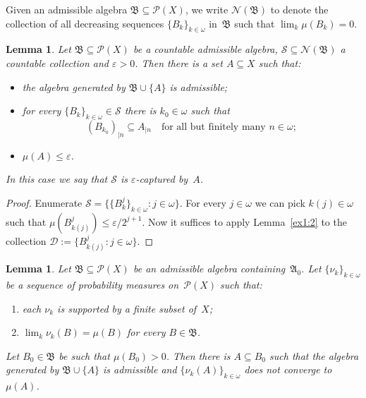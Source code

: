 \documentclass[12pt]{amsart}
\newcommand{\sub}{\subseteq}
\newcommand\eps{\ensuremath{\varepsilon}}
\newcommand{\alg}{\mathfrak A}
\newcommand{\algb}{\mathfrak B}
\newcommand{\NN}{{\mathcal N}}
\newcommand{\PP}{{\mathcal P}}
\newcommand{\0}{\protect{\bf 0}}
\newcommand{\1}{\protect{\bf 1}}
\newtheorem{lemma}[theo]{Lemma}
\theoremstyle{definition}
\theoremstyle{remark}
\numberwithin{equation}{section}
\begin{document}
Given an admissible algebra $\algb \sub \mathcal{P}(X)$, we write $\NN(\algb)$ to denote the collection
of all decreasing sequences $\{B_k\}_{k\in \omega}$ in~$\algb$ such
that $\lim_k\mu(B_k)= 0$. 

\begin{lemma}\label{ex1:4}
Let $\algb \sub \mathcal{P}(X)$ be a countable admissible algebra,  
$\mathcal{S} \sub \NN(\algb)$ a countable collection and $\eps>0$.
Then there is a set $A\sub X$ such that:
\begin{itemize}
\item[(i)] the algebra generated by $\algb\cup \{A\}$ is admissible;
\item[(ii)] for every $\{B_k\}_{k\in \omega}\in \mathcal{S}$ there is $k_0\in \omega$ such that
\[ 
	(B_{k_0})_{|n}\sub A_{|n} \quad \mbox{for all but finitely many } n\in \omega;
\]
\item[(iii)] $\mu(A)\leq\eps$.
\end{itemize}
In this case we say that $\mathcal{S}$ is \emph{$\eps$-captured} by~$A$.
\end{lemma}
\begin{proof}
Enumerate $\mathcal{S}=\{\{B^j_k\}_{k\in \omega}: j\in \omega\}$.
For every $j\in \omega$ we can pick $k(j)\in \omega$ such that $\mu(B^j_{k(j)})\leq\eps/2^{j+1}$.
Now it suffices to apply Lemma~\ref{ex1:2} to the collection $\mathcal{D}:=\{B^j_{k(j)}:j\in \omega\}$.
\end{proof}

\begin{lemma}\label{ex1:4a}
Let $\algb \sub \PP(X)$ be an admissible algebra containing~$\alg_0$.
Let $\{\nu_k\}_{k\in \omega}$ be a sequence of probability measures on~$\PP(X)$ such that:
\begin{enumerate}
\item[(i)] each $\nu_k$ is supported by a finite subset of~$X$; 
\item[(ii)] $\lim_k \nu_k(B)=\mu(B)$ for every $B\in\algb$.
\end{enumerate}
Let $B_0\in\algb$ be such that $\mu(B_0)>0$.
Then there is $A\sub B_0$ such that the algebra generated by
$\algb\cup \{A\}$ is admissible and $\{\nu_k(A)\}_{k\in \omega}$ does not converge to $\mu(A)$.
\end{lemma}
\end{document}
